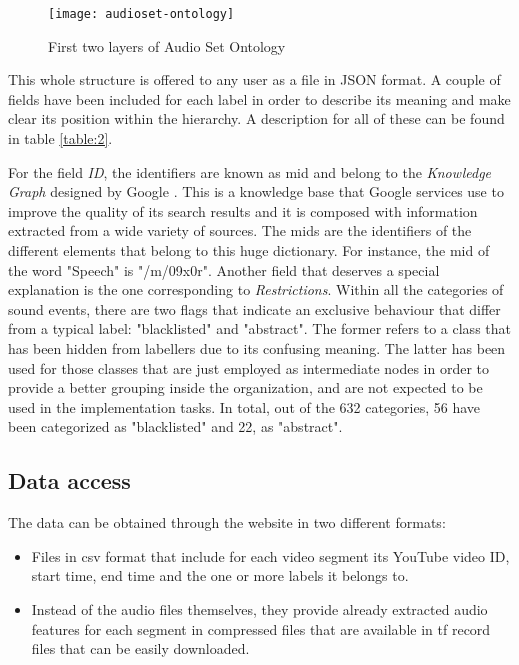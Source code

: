 	\begin{figure}[h]
		\centering
		\captionsetup{justification=centering}
		\texttt{[image: audioset-ontology]}
		\caption{First two layers of Audio Set Ontology \cite{Gemmeke2017}}
		\label{fig:mesh1}
	\end{figure}
	
	This whole structure is offered to any user as a file in JSON format. A couple of fields have been included for each label in order to describe its meaning and make clear its position within the hierarchy. A description for all of these can be found in table \ref{table:2}. 
	
	
	
	For the field \textit{ID}, the identifiers are known as \acrfull{mid} and belong to the \textit{Knowledge Graph} designed by Google \cite{Singhal2012}. This is a knowledge base that Google services use to improve the quality of its search results and it is composed with information extracted from a wide variety of sources. The \acrshort{mid}s are the identifiers of the different elements that belong to this huge dictionary. For instance, the \acrshort{mid} of the word "Speech" is "/m/09x0r". Another field that deserves a special explanation is the one corresponding to \textit{Restrictions}. Within all the categories of sound events, there are two flags that indicate an exclusive behaviour that differ from a typical label: "blacklisted" and "abstract". The former refers to a class that has been hidden from labellers due to its confusing meaning. The latter has been used for those classes that are just employed as intermediate nodes in order to provide a better grouping inside the organization, and are not expected to be used in the implementation tasks. In total, out of the 632 categories, 56 have been categorized as "blacklisted" and 22, as "abstract".


\subsection{Data access}
\label{subsection:data-access}

	The data can be obtained through the website \cite{SoundUnderstandinggroup2017} in two different formats:

	\begin{itemize}
		\item Files in \acrshort{csv} format that include for each video segment its YouTube video ID, start time, end time and the one or more labels it belongs to. 
		\item Instead of the audio files themselves, they provide already extracted audio features for each segment in compressed files that are available in \acrfull{tf} \cite{GoogleResearch2015} record files that can be easily downloaded.
	\end{itemize}
	
